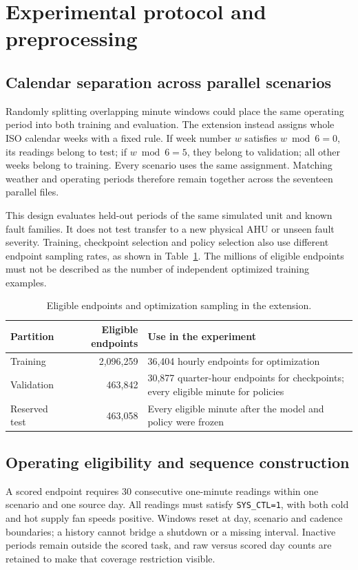 \section{Experimental protocol and preprocessing}
\subsection{Calendar separation across parallel scenarios}
Randomly splitting overlapping minute windows could place the same operating period into both training and evaluation. The extension instead assigns whole ISO calendar weeks with a fixed rule. If week number $w$ satisfies $w\bmod6=0$, its readings belong to test; if $w\bmod6=5$, they belong to validation; all other weeks belong to training. Every scenario uses the same assignment. Matching weather and operating periods therefore remain together across the seventeen parallel files.

This design evaluates held-out periods of the same simulated unit and known fault families. It does not test transfer to a new physical AHU or unseen fault severity. Training, checkpoint selection and policy selection also use different endpoint sampling rates, as shown in Table~\ref{tab:new-split}. The millions of eligible endpoints must not be described as the number of independent optimized training examples.

\begin{table}[htbp]\centering\small
\caption{Eligible endpoints and optimization sampling in the extension.}\label{tab:new-split}
\begin{tabularx}{\linewidth}{l r X}
\toprule
Partition & Eligible endpoints & Use in the experiment \\
\midrule
Training & 2,096,259 & 36,404 hourly endpoints for optimization \\
Validation & 463,842 & 30,877 quarter-hour endpoints for checkpoints; every eligible minute for policies \\
Reserved test & 463,058 & Every eligible minute after the model and policy were frozen \\
\bottomrule\end{tabularx}
\end{table}

\subsection{Operating eligibility and sequence construction}
A scored endpoint requires 30 consecutive one-minute readings within one scenario and one source day. All readings must satisfy \texttt{SYS\_CTL=1}, with both cold and hot supply fan speeds positive. Windows reset at day, scenario and cadence boundaries; a history cannot bridge a shutdown or a missing interval. Inactive periods remain outside the scored task, and raw versus scored day counts are retained to make that coverage restriction visible.


